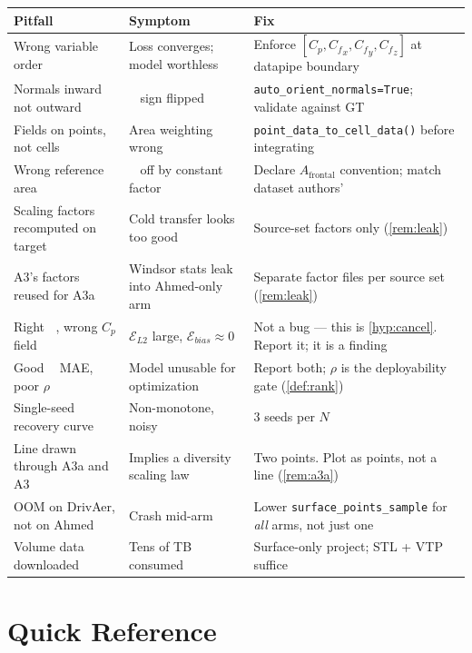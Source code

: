 \documentclass[10pt,a4paper]{article}
\theoremstyle{definition}
\DeclareMathOperator{\Cd}{C_d}
\newcommand{\Cp}{{C_p}}
\newcommand{\Cf}{{C_f}}
\begin{document}
\begin{center}\small
\begin{tabular}{@{}p{4.2cm}p{4.0cm}p{6.8cm}@{}}
\toprule
Pitfall & Symptom & Fix \\
\midrule
Wrong variable order & Loss converges; model worthless
  & Enforce $[\Cp, \Cf_x, \Cf_y, \Cf_z]$ at datapipe boundary \\
Normals inward not outward & $\Cd$ sign flipped
  & \texttt{auto\_orient\_normals=True}; validate against GT \\
Fields on points, not cells & Area weighting wrong
  & \texttt{point\_data\_to\_cell\_data()} before integrating \\
Wrong reference area & $\Cd$ off by constant factor
  & Declare $A_{\text{frontal}}$ convention; match dataset authors' \\
Scaling factors recomputed on target & Cold transfer looks too good
  & Source-set factors only (\cref{rem:leak}) \\
A3's factors reused for A3a & Windsor stats leak into Ahmed-only arm
  & Separate factor files per source set (\cref{rem:leak}) \\
Right $\Cd$, wrong $\Cp$ field & $\mathcal{E}_{L2}$ large, $\mathcal{E}_{bias}\approx 0$
  & Not a bug --- this is \cref{hyp:cancel}. Report it; it is a finding \\
Good $\Cd$ MAE, poor $\rho$ & Model unusable for optimization
  & Report both; $\rho$ is the deployability gate (\cref{def:rank}) \\
Single-seed recovery curve & Non-monotone, noisy
  & 3 seeds per $N$ \\
Line drawn through A3a and A3 & Implies a diversity scaling law
  & Two points. Plot as points, not a line (\cref{rem:a3a}) \\
OOM on DrivAer, not on Ahmed & Crash mid-arm
  & Lower \texttt{surface\_points\_sample} for \emph{all} arms, not just one \\
Volume data downloaded & Tens of TB consumed
  & Surface-only project; STL + VTP suffice \\
\bottomrule
\end{tabular}
\end{center}

\section{Quick Reference}
\end{document}
